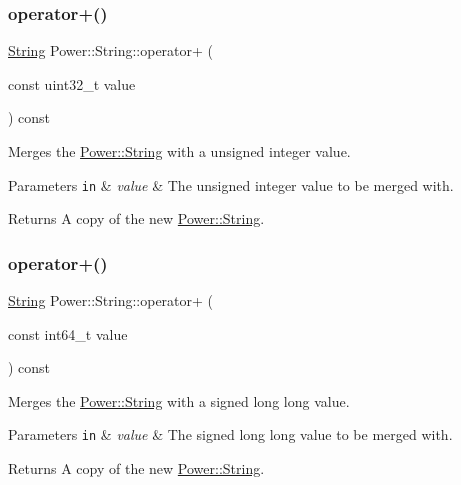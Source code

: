 \subsubsection{\texorpdfstring{operator+()}{operator+()}\hspace{0.1cm}{\footnotesize\ttfamily [7/11]}}
{\footnotesize\ttfamily \hyperlink{class_power_1_1_string}{String} Power\+::\+String\+::operator+ (\begin{DoxyParamCaption}\item[{const uint32\+\_\+t}]{value }\end{DoxyParamCaption}) const\hspace{0.3cm}{\ttfamily [inline]}}



Merges the \hyperlink{class_power_1_1_string}{Power\+::\+String} with a unsigned integer value. 


\begin{DoxyParams}[1]{Parameters}
\mbox{\tt in}  & {\em value} & The unsigned integer value to be merged with. \\
\hline
\end{DoxyParams}
\begin{DoxyReturn}{Returns}
A copy of the new \hyperlink{class_power_1_1_string}{Power\+::\+String}. 
\end{DoxyReturn}
\mbox{\label{class_power_1_1_string_a6786c4c855394ed972fcee194f5b0b59}} 
\subsubsection{\texorpdfstring{operator+()}{operator+()}\hspace{0.1cm}{\footnotesize\ttfamily [8/11]}}
{\footnotesize\ttfamily \hyperlink{class_power_1_1_string}{String} Power\+::\+String\+::operator+ (\begin{DoxyParamCaption}\item[{const int64\+\_\+t}]{value }\end{DoxyParamCaption}) const\hspace{0.3cm}{\ttfamily [inline]}}



Merges the \hyperlink{class_power_1_1_string}{Power\+::\+String} with a signed long long value. 


\begin{DoxyParams}[1]{Parameters}
\mbox{\tt in}  & {\em value} & The signed long long value to be merged with. \\
\hline
\end{DoxyParams}
\begin{DoxyReturn}{Returns}
A copy of the new \hyperlink{class_power_1_1_string}{Power\+::\+String}. 
\end{DoxyReturn}
\mbox{\label{class_power_1_1_string_aeff2ea13da477a4e313cdac2fcea1856}} 
